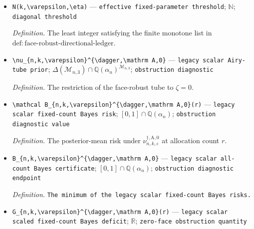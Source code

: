 \documentclass{article}
\begin{document}
\begin{itemize}
  \par\smallskip\noindent\emph{Definition.} The eight-type and six-cell rational maximum in \(\mathrm{def:face\text{-}robust\text{-}directional\text{-}ledger}\).
  \item \texttt{N(k,\allowbreak{}\textbackslash{}\allowbreak{}varepsilon,\allowbreak{}\textbackslash{}\allowbreak{}eta)} --- \texttt{effective fixed-\allowbreak{}parameter threshold}; \(\mathbb N\); \texttt{diagonal threshold}
  \par\smallskip\noindent\emph{Definition.} The least integer satisfying the finite monotone list in \(\mathrm{def:face\text{-}robust\text{-}directional\text{-}ledger}\).
  \item \texttt{\textbackslash{}\allowbreak{}nu\_\allowbreak{}\{n,\allowbreak{}k,\allowbreak{}\textbackslash{}\allowbreak{}varepsilon\}\allowbreak{}\textasciicircum{}\{\textbackslash{}\allowbreak{}dagger,\allowbreak{}\textbackslash{}\allowbreak{}mathrm A,\allowbreak{}0\}\allowbreak{}} --- \texttt{legacy scalar Airy-\allowbreak{}tube prior}; \(\Delta(\mathcal M_{n,3})\cap\mathbb Q(\alpha_n)^{\mathcal M_{n,3}}\); \texttt{obstruction diagnostic}
  \par\smallskip\noindent\emph{Definition.} The restriction of the face-robust tube to \(\zeta=0\).
  \item \texttt{\textbackslash{}\allowbreak{}mathcal B\_\allowbreak{}\{n,\allowbreak{}k,\allowbreak{}\textbackslash{}\allowbreak{}varepsilon\}\allowbreak{}\textasciicircum{}\{\textbackslash{}\allowbreak{}dagger,\allowbreak{}\textbackslash{}\allowbreak{}mathrm A,\allowbreak{}0\}\allowbreak{}(r)} --- \texttt{legacy scalar fixed-\allowbreak{}count Bayes risk}; \([0,1]\cap\mathbb Q(\alpha_n)\); \texttt{obstruction diagnostic value}
  \par\smallskip\noindent\emph{Definition.} The posterior-mean risk under \(\nu_{n,k,\varepsilon}^{\dagger,\mathrm A,0}\) at allocation count \(r\).
  \item \texttt{B\_\allowbreak{}\{n,\allowbreak{}k,\allowbreak{}\textbackslash{}\allowbreak{}varepsilon\}\allowbreak{}\textasciicircum{}\{\textbackslash{}\allowbreak{}dagger,\allowbreak{}\textbackslash{}\allowbreak{}mathrm A,\allowbreak{}0\}\allowbreak{}} --- \texttt{legacy scalar all-\allowbreak{}count Bayes certificate}; \([0,1]\cap\mathbb Q(\alpha_n)\); \texttt{obstruction diagnostic endpoint}
  \par\smallskip\noindent\emph{Definition.} \texttt{The minimum of the legacy scalar fixed-\allowbreak{}count Bayes risks.}
  \item \texttt{G\_\allowbreak{}\{n,\allowbreak{}k,\allowbreak{}\textbackslash{}\allowbreak{}varepsilon\}\allowbreak{}\textasciicircum{}\{\textbackslash{}\allowbreak{}dagger,\allowbreak{}\textbackslash{}\allowbreak{}mathrm A,\allowbreak{}0\}\allowbreak{}(r)} --- \texttt{legacy scalar scaled fixed-\allowbreak{}count Bayes deficit}; \(\mathbb R\); \texttt{zero-\allowbreak{}face obstruction quantity}

\end{itemize}
\end{document}
